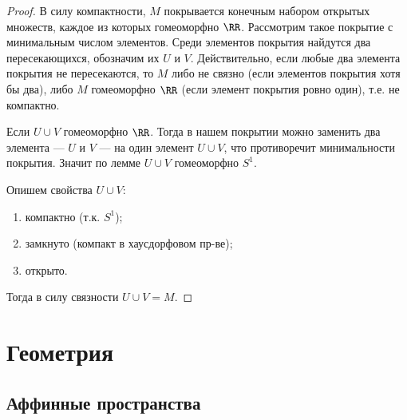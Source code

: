\documentclass[12pt,a4paper]{article}
\begin{document}
\begin{proof}
        В силу компактности, $M$ покрывается конечным набором открытых множеств, каждое из которых гомеоморфно $\RR$. Рассмотрим такое покрытие с минимальным числом элементов. Среди элементов покрытия найдутся два пересекающихся, обозначим их $U$ и $V$. Действительно, если любые два элемента покрытия не пересекаются, то $M$ либо не связно (если элементов покрытия хотя бы два), либо $M$ гомеоморфно $\RR$ (если элемент покрытия ровно один), т.е. не компактно.
        
        Если $U \cup V$ гомеоморфно $\RR$. Тогда в нашем покрытии можно заменить два элемента --- $U$ и $V$ --- на один элемент $U \cup V$, что противоречит минимальности покрытия. Значит по лемме $U \cup V$ гомеоморфно $S^1$.
        
        Опишем свойства $U \cup V$:
        \begin{multicols}{3}
            \begin{enumerate}
                \item компактно (т.к. $S^1$);
                \item замкнуто (компакт в хаусдорфовом пр-ве);
                \item открыто.
            \end{enumerate}
        \end{multicols}
        Тогда в силу связности $U \cup V = M$.
    \end{proof}

    \section{Геометрия}

    \subsection{Аффинные пространства}
\end{document}
